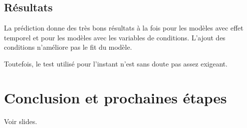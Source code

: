 \documentclass[11pt,a4paper]{article}
\begin{document}
\subsection*{Résultats}

La prédiction donne des très bons résultats à la fois pour les modèles avec effet temporel et pour les modèles avec les variables de conditions. L'ajout des conditions n'améliore pas le fit du modèle. 

Toutefois, le test utilisé pour l'instant n'est sans doute pas assez exigeant.  

\section{Conclusion et prochaines étapes}

Voir slides. 
\end{document}
